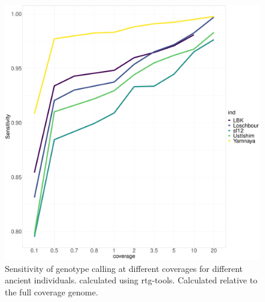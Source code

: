 \begin{figure}[htp]
    \centering
    \includegraphics[width=1.0\textwidth]{../images/chapter1/allDownsampled_rtgtools_sensitivity.pdf}
    \caption{Sensitivity of genotype calling at different coverages for different ancient individuals.  calculated using rtg-tools. Calculated relative to the full coverage genome.}
    \label{fig:Sensitivity_downsampled_rtgtools}
\end{figure}

